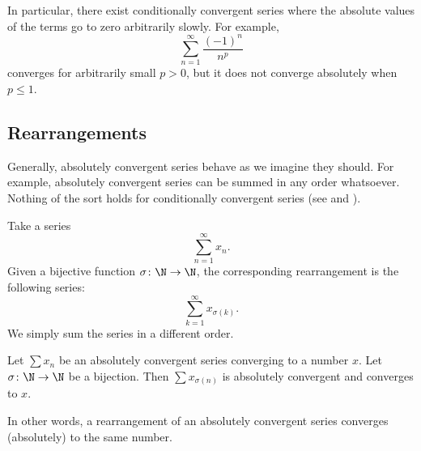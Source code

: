 \documentclass[12pt]{book}
\begin{document}
In particular, there exist conditionally convergent series
where the absolute values of the terms go to zero arbitrarily slowly.
For example,
\begin{equation*}
\sum_{n=1}^\infty \frac{{(-1)}^n}{n^p}
\end{equation*}
converges for arbitrarily small $p > 0$, but it does not converge
absolutely when $p \leq 1$.

\subsection*{Rearrangements}

Generally,
absolutely convergent series behave as we imagine they should.
For example,
absolutely convergent series can be summed in any order whatsoever.
Nothing
of the sort holds for conditionally convergent series
(see 
and ).

Take a series
\begin{equation*}
\sum_{n=1}^\infty x_n .
\end{equation*}
Given a bijective function $\sigma \colon \N \to \N$, the corresponding
rearrangement is the following
series:
\begin{equation*}
\sum_{k=1}^\infty x_{\sigma(k)} .
\end{equation*}
We simply sum the series in a different order.

\begin{prop}
Let $\sum x_n$ be an absolutely convergent series converging to a number
$x$.
Let $\sigma \colon \N \to \N$ be a bijection.
Then
$\sum x_{\sigma(n)}$ is absolutely convergent and converges to $x$.
\end{prop}

In other words,
a rearrangement of an absolutely convergent series converges (absolutely)
to the same number.
\end{document}
